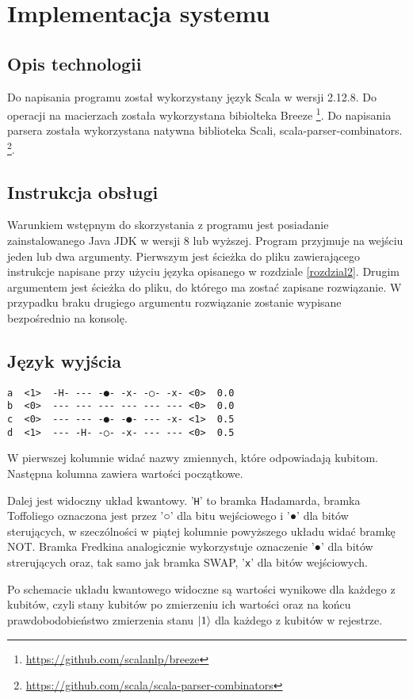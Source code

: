 \chapter{Implementacja systemu}
\thispagestyle{chapterBeginStyle}
\label{rozdzial3}

\section{Opis technologii}
Do napisania programu został wykorzystany język Scala w wersji 2.12.8. Do operacji na macierzach została wykorzystana bibiolteka Breeze \footnote{\url{https://github.com/scalanlp/breeze}}. Do napisania parsera została wykorzystana natywna biblioteka Scali, scala-parser-combinators.
\footnote{\url{https://github.com/scala/scala-parser-combinators}}.
\section{Instrukcja obsługi}
Warunkiem wstępnym do skorzystania z programu jest posiadanie zainstalowanego Java JDK w wersji 8 lub wyższej. Program przyjmuje na wejściu jeden lub dwa argumenty. Pierwszym jest ścieżka do pliku zawierającego instrukcje napisane przy użyciu języka opisanego w rozdziale \ref{rozdzial2}. Drugim argumentem jest ścieżka do pliku, do którego ma zostać zapisane rozwiązanie. W przypadku braku drugiego argumentu rozwiązanie zostanie wypisane bezpośrednio na konsolę.
\section{Język wyjścia}
\begin{verbatim}
a  <1>  -H- --- -●- -x- -○- -x- <0>  0.0
b  <0>  --- --- --- --- --- --- <0>  0.0
c  <0>  --- --- -●- -●- --- -x- <1>  0.5
d  <1>  --- -H- -○- -x- --- --- <0>  0.5
\end{verbatim}
W pierwszej kolumnie widać nazwy zmiennych, które odpowiadają kubitom. Następna kolumna zawiera wartości początkowe. 
\par Dalej jest widoczny układ kwantowy. '\texttt{H}' to bramka Hadamarda, bramka Toffoliego oznaczona jest przez '○' dla bitu wejściowego i '●' dla bitów sterujących, w szeczólności w piątej kolumnie powyższego układu widać bramkę NOT. Bramka Fredkina analogicznie wykorzystuje oznaczenie '●' dla bitów strerujących oraz, tak samo jak bramka SWAP, '\texttt{x}' dla bitów wejściowych.
\par Po schemacie układu kwantowego widoczne są wartości wynikowe dla każdego z kubitów, czyli stany kubitów po zmierzeniu ich wartości oraz na końcu prawdobodobieństwo zmierzenia stanu $\ket{1}$ dla każdego z kubitów w rejestrze.